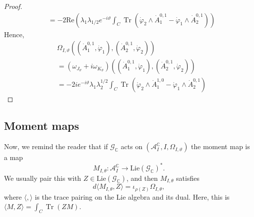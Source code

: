 \documentclass[12pt,letterpaper,reqno]{amsart}
\theoremstyle{remark}
\theoremstyle{definition}
\numberwithin{thm}{section}
\numberwithin{equation}{section}
\numberwithin{figure}{section}
\newcommand{\C}{\ensuremath{\mathbb C}}
\DeclareMathOperator{\Tr}{Tr}
\begin{document}
\begin{proof}
\begin{align*}
&=-2 \mathrm{Re}  \left( \lambda_1 \lambda_{1/2} e^{-i \vartheta} \int_C \Tr  \left(\dot\varphi_{2} \wedge \dot{A}_1^{0,1}   - \dot{\varphi}_1  \wedge \dot{A}^{0,1}_{2}   \right) \right)
\end{align*}
Hence,
\begin{align*}
&\Omega_{I, \vartheta}\left((\dot{A}^{0,1}_1, \dot{\varphi}_1), (\dot{A}^{0,1}_2, \dot{\varphi}_2)\right)\\
&=(\omega_{J_\vartheta} + i \omega_{K_\vartheta})\left((\dot{A}^{0,1}_1, \dot{\varphi}_1), (\dot{A}^{0,1}_2, \dot{\varphi}_2)\right)\\
&=-2i e^{-i \vartheta}   \lambda_1 \lambda_2^{1/2} \int_C  \Tr  \left(\dot{\varphi}_2  \wedge \dot{A}_{1}^{1,0}  - \dot{\varphi}_1 \wedge \dot{A}^{0,1}_{2}  \right) 
\end{align*}
\end{proof}
\subsection{Moment maps}

Now, we remind the reader that if $\mathcal{G}_{\C}$ acts on $(\mathcal{A}_I^{\C}, I, \Omega_{I, \vartheta})$ the moment map is a map $$M_{I, \theta}: \mathcal{A}_I^{\C} \to \mathrm{Lie}(\mathcal{G}_{\C})^*.$$ 
We usually pair this with $Z \in  \mathrm{Lie}(\mathcal{G}_{\C})$, and then $M_{I, \theta}$ satisfies
 \[d \langle M_{I, \theta}, Z \rangle = \iota_{\rho(Z)} \Omega_{I, \theta}, \]
where $\langle , \rangle $ is the trace pairing on the Lie algebra and its dual. Here, this is $\langle M , Z \rangle  = \int_{C} \Tr(Z M)$.
\end{document}

